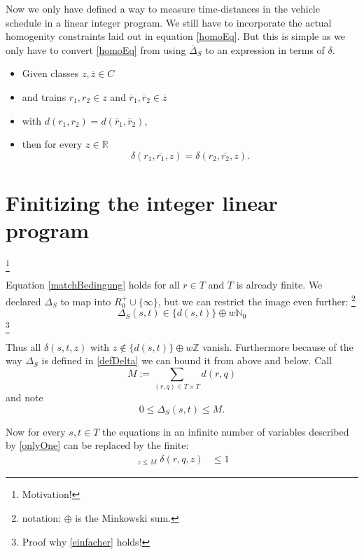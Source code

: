 \documentclass[a4paper]{amsart} %
\newcommand{\ol}[1]{\overline{#1}}
\newcommand{\todo}[1]{\footnote{#1}}
\begin{document}
Now we only have defined a way to measure time-distances in the
vehicle schedule in a linear integer program.  We still have to
incorporate the actual homogenity constraints laid out in equation
\ref{homoEq}.  But this is simple as we only have to convert
\ref{homoEq} from using \(\ol{\Delta}_S\) to an expression in terms of \(\delta\).

\begin{itemize}
\item Given classes \(z, \ol{z} \in C\)
\item and trains \(r_1, r_2 \in z\) and \(\ol{r}_1,\ol{r}_2 \in \ol{z}\)
\item with \( d (r_1, r_2) = d(\ol{r}_1, \ol{r}_2) \),
\item then for every \(z \in \mathbb{R}\)
\begin{equation}
\label{homoEqLin}
  \delta    (r_1, \ol{r_1}, z) = \delta (r_2, \ol{r_2}, z)\textrm{.}
\end{equation}
\end{itemize}

\section{Finitizing the integer linear program}
\label{finitizing}
\todo{Motivation!}

Equation \ref{matchBedingung} holds for all \(r \in T\) and \(T\) is
already finite.  We declared \(\Delta_S\) to map into \(R^+_0 \cup
\{\infty\}\), but we can restrict the image even further:
\todo{notation: \(\oplus\) is the Minkowski sum.}
\begin{equation}
\label{einfacher}
\Delta_S (s,t) \in \{d (s,t)\} \oplus w \mathbb{N}_0
\end{equation}
\todo{Proof why \ref{einfacher} holds!}

Thus all \(\delta (s, t, z)\) with \(z \notin \{d (s,t)\} \oplus w
\mathbb{Z}\) vanish.  Furthermore because of the way \(\Delta_S\) is
defined in \ref{defDelta} we can bound it from above and below. Call
\begin{equation}
M := \sum_{(r,q) \in T \times T} d (r,q)
\end{equation}
and note
\[0 \leq \Delta_S(s,t) \leq M \textrm{.}\]


Now for every \(s,t \in T\) the equations in an infinite number of
variables described by \ref{onlyOne} can be replaced by the finite:
\begin{align}
  \label{onlyOneFinite}
  \mathop{\sum_{z \in \left\{d (s,t)\right\} \oplus w \mathbb{N}_0}}_{z\leq M} \delta(r, q, z) & \leq 1 
\end{align}
\end{document}
